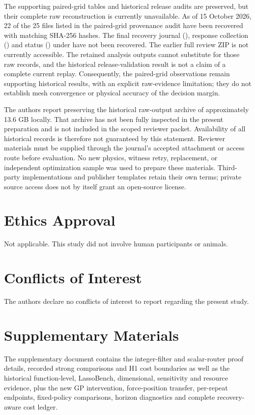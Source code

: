 \documentclass[]{interact}
\begin{document}
The supporting paired-grid tables and historical release audits are preserved, but their complete raw reconstruction is currently unavailable. As of 15 October 2026, 22 of the 25 files listed in the paired-grid provenance audit have been recovered with matching SHA-256 hashes. The final recovery journal (), response collection () and status () under  have not been recovered. The earlier full review ZIP is not currently accessible. The retained analysis outputs cannot substitute for those raw records, and the historical release-validation result is not a claim of a complete current replay. Consequently, the paired-grid observations remain supporting historical results, with an explicit raw-evidence limitation; they do not establish mesh convergence or physical accuracy of the decision margin.

The authors report preserving the historical raw-output archive of approximately 13.6 GB locally. That archive has not been fully inspected in the present preparation and is not included in the scoped reviewer packet. Availability of all historical records is therefore not guaranteed by this statement. Reviewer materials must be supplied through the journal's accepted attachment or access route before evaluation. No new physics, witness retry, replacement, or independent optimization sample was used to prepare these materials. Third-party implementations and publisher templates retain their own terms; private source access does not by itself grant an open-source license.

\section*{Ethics Approval}

Not applicable. This study did not involve human participants or animals.

\section*{Conflicts of Interest}

The authors declare no conflicts of interest to report regarding the present study.

\section*{Supplementary Materials}

The supplementary document contains the integer-filter and scalar-router proof details, recorded strong comparisons and H1 cost boundaries as well as the historical function-level, LassoBench, dimensional, sensitivity and resource evidence, plus the new GP intervention, force-position transfer, per-repeat endpoints, fixed-policy comparisons, horizon diagnostics and complete recovery-aware cost ledger.


\end{document}
